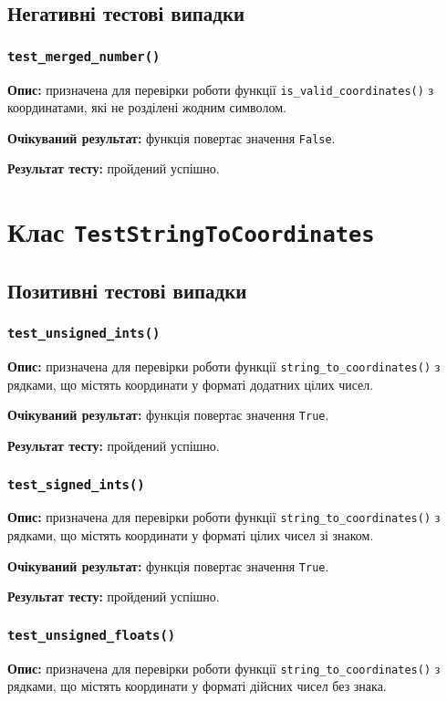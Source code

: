 \documentclass[a4paper,oneside,DIV=12,12pt]{scrartcl}
\newcommand{\classname}[1]{\texttt{#1}}
\newcommand{\funcname}[1]{\texttt{#1}}
\newcommand{\caseattrib}[1]{\noindent\textbf{#1}}
\newcommand{\printtrue}{\texttt{True}}
\newcommand{\printfalse}{\texttt{False}}
\begin{document}
		\subsection{Негативні тестові випадки}
			\subsubsection{\funcname{test\_merged\_number()}}
				\caseattrib{Опис:} призначена для перевірки роботи функції \verb|is_valid_coordinates()| з координатами, які не розділені жодним символом.
				
				\caseattrib{Очікуваний результат:} функція повертає значення \printfalse.
				
				\caseattrib{Результат тесту:} пройдений успішно.
	
	\section{Клас \classname{TestStringToCoordinates}}
		
		\subsection{Позитивні тестові випадки}
			\subsubsection{\funcname{test\_unsigned\_ints()}}
				\caseattrib{Опис:} призначена для перевірки роботи функції \verb|string_to_coordinates()| з рядками, що містять координати у форматі додатних цілих чисел.
				
				\caseattrib{Очікуваний результат:} функція повертає значення \printtrue.
				
				\caseattrib{Результат тесту:} пройдений успішно.
				
			\subsubsection{\funcname{test\_signed\_ints()}}
				\caseattrib{Опис:} призначена для перевірки роботи функції \verb|string_to_coordinates()| з рядками, що містять координати у форматі цілих чисел зі знаком.
				
				\caseattrib{Очікуваний результат:} функція повертає значення \printtrue.
				
				\caseattrib{Результат тесту:} пройдений успішно.
				
			\subsubsection{\funcname{test\_unsigned\_floats()}}
				\caseattrib{Опис:} призначена для перевірки роботи функції \verb|string_to_coordinates()| з рядками, що містять координати у форматі дійсних чисел без знака.
				
\end{document}
